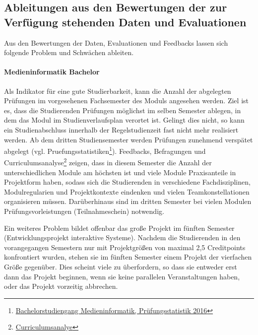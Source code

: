 \subsection{Ableitungen aus den Bewertungen der zur Verfügung
stehenden Daten und
Evaluationen}\label{ableitungen-aus-den-bewertungen-der-zur-verfuxfcgung-stehenden-daten-und-evaluationen}

Aus den Bewertungen der Daten, Evaluationen und Feedbacks lassen sich
folgende Problem und Schwächen ableiten.

\paragraph{Medieninformatik Bachelor}\label{medieninformatik-bachelor}

Als Indikator für eine gute Studierbarkeit, kann die Anzahl der
abgelegten Prüfungen im vorgesehenen Fachsemester des Moduls angesehen
werden. Ziel ist es, dass die Studierenden Prüfungen möglichst im selben
Semester ablegen, in dem das Modul im Studienverlaufsplan verortet ist.
Gelingt dies nicht, so kann ein Studienabschluss innerhalb der
Regelstudienzeit fast nicht mehr realisiert werden. Ab dem dritten
Studiensemester werden Prüfungen zunehmend verspätet abgelegt (vgl.
Pruefungsstatistiken\footnote{\href{https://th-koeln.github.io/mi-2017/anhaenge/ba-pruefungsstatistiken.pdf}{Bachelorstudiengang
  Medieninformatik, Prüfungsstatistik 2016}}). Feedbacks, Befragungen
und Curriculumsanalyse\footnote{\href{https://th-koeln.github.io/mi-2017/anhaenge/ba-pruefungsstatistiken.pdf}{Curriculumsanalye}}
zeigen, dass in diesem Semester die Anzahl der unterschiedlichen Module
am höchsten ist und viele Module Praxisanteile in Projektform haben,
sodass sich die Studierenden in verschiedene Fachdisziplinen,
Modulregularien und Projektkontexte eindenken und vielen
Teamkonstellationen organisieren müssen. Darüberhinaus sind im dritten
Semester bei vielen Modulen Prüfungsvorleistungen (Teilnahmeschein)
notwendig.

Ein weiteres Problem bildet offenbar das große Projekt im fünften
Semester (Entwicklungsprojekt interaktive Systeme). Nachdem die
Studierenden in den vorangegangen Semestern nur mit Projektgrößen von
maximal 2,5 Creditpoints konfrontiert wurden, stehen sie im fünften
Semester einem Projekt der vierfachen Größe gegenüber. Dies scheint
viele zu überfordern, so dass sie entweder erst dann das Projekt
beginnen, wenn sie keine parallelen Veranstaltungen haben, oder das
Projekt vorzeitig abbrechen.

